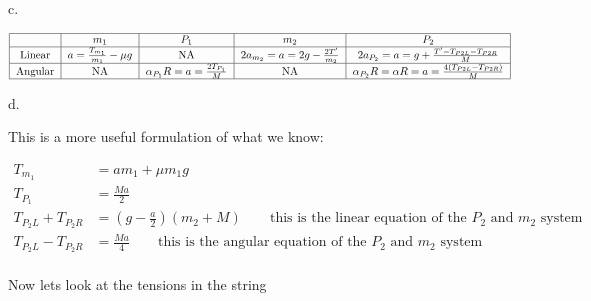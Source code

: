 \documentclass[12pt]{article}
\begin{document}
    c.

    \begin{equation*}
        \begin{tabular}{ |c|c|c|c|c| } 
            \hline
            & \(m_1\) & \(P_1\) & \(m_2\) & \(P_2\) \\
            \hline
            Linear & \(a=\frac{T_{m_1}}{m_1}-\mu g\) & NA & \(2a_{m_2}=a=2g-\frac{2T'}{m_2}\) & \(2a_{P_2}=a=g+\frac{T'-T_{P2L}-T_{P2R}}{M}\) \\
            \hline
            Angular & NA & \(\alpha_{P_1} R=a=\frac{2T_{P_1}}{M}\) & NA & \(\alpha_{P_2} R=\alpha R=a=\frac{4(T_{P2L}-T_{P2R})}{M}\) \\
            \hline
           \end{tabular}
    \end{equation*}

    d.

    \vspace{12pt}

    This is a more useful formulation of what we know:

    \begin{equation*}
        \begin{split}
            T_{m_1}&=am_1+\mu m_1g\\
            T_{P_1}&=\frac{Ma}{2}\\
            T_{P_2L}+T_{P_2R}&=(g-\frac{a}{2})(m_2+M)\qquad\text{this is the linear equation of the \(P_2\) and \(m_2\) system}\\
            T_{P_2L}-T_{P_2R}&=\frac{Ma}{4}\qquad\text{this is the angular equation of the \(P_2\) and \(m_2\) system}\\
        \end{split}
    \end{equation*}

    Now lets look at the tensions in the string

    \begin{center}
    \end{center}
\end{document}
